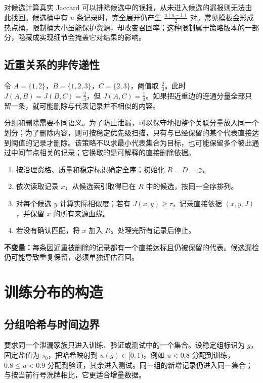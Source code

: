 \documentclass[../textbook.tex]{subfiles}
\begin{document}
对候选计算真实 Jaccard 可以排除候选中的误报，从未进入候选的漏报则无法由此找回。候选桶中有 $u$ 条记录时，完全展开仍产生 $\frac{u(u-1)}{2}$ 对。常见模板会形成热点桶，限制桶大小虽能保护资源，却改变召回率；这种限制属于策略版本的一部分，隐藏成实现细节会掩盖它对结果的影响。

\subsection{近重关系的非传递性}
令 $A=\{1,2\}$，$B=\{1,2,3\}$，$C=\{2,3\}$，阈值取 $\frac{2}{3}$。此时 $J(A,B)=J(B,C)=\frac{2}{3}$，但 $J(A,C)=\frac{1}{3}$。如果把近重边的连通分量全部只留一条，就可能删除与代表记录并不相似的内容。

分组和删除需要不同语义。为了防止泄漏，可以保守地把整个关联分量放入同一个划分；为了删除内容，则可按稳定优先级扫描，只有与已经保留的某个代表直接达到阈值的记录才删除。该策略不以求最小代表集合为目标，也可能保留多个彼此通过中间节点相关的记录；它换取的是可解释的直接删除依据。

\begin{algorithm}[稳定代表去重]
\label{alg:data-dedup}
\begin{enumerate}
\item 按治理资格、质量和稳定标识确定全序；初始化 $R=D=\varnothing$。
\item 依次读取记录 $x$，从候选索引取得已在 $R$ 中的候选，按同一全序排列。
\item 对每个候选 $y$ 计算实际相似度；若有 $J(x,y)\ge\tau$，记录直接依据 $(x,y,J)$，并保留 $x$ 的所有来源血缘。
\item 若没有确认匹配，将 $x$ 加入 $R$。处理完所有记录后停止。
\end{enumerate}
\textbf{不变量：}每条因近重被删除的记录都有一个直接达标且仍被保留的代表。候选漏检仍可能导致重复保留，必须单独评估召回。
\end{algorithm}

\section{训练分布的构造}

\subsection{分组哈希与时间边界}
要求同一个泄漏家族只进入训练、验证或测试中的一个集合。设稳定组标识为 $g$，固定盐值为 $s_0$，把哈希映射到 $u(g)\in[0,1)$。例如 $u<0.8$ 分配到训练，$0.8\le u<0.9$ 分配到验证，其余进入测试。同一组的新增记录仍进入同一集合；与按当前行号洗牌相比，它更适合增量数据。
\end{document}
